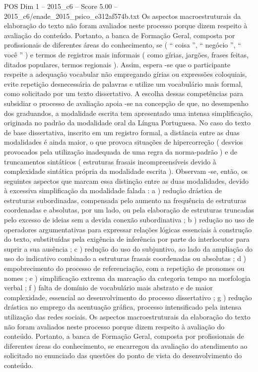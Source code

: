 \begin{textsample}{POS Dim 1 – 2015\_c6 – Score 5.00 – 2015\_c6/enade\_2015\_psico\_e312af574b.txt}
Os aspectos macroestruturais da elaboração do texto não foram avaliados neste processo porque dizem respeito à avaliação do conteúdo.
Portanto, a banca de Formação Geral, composta por profissionais de diferentes áreas do conhecimento, se ( “ coisa ”, “ negócio ”, “ você ” ) e termos de registros mais informais ( como gírias, jargões, frases feitas, ditados populares, termos regionais ).
Assim, espera -se que o participante respeite a adequação vocabular não empregando gírias ou expressões coloquiais, evite repetição desnecessária de palavras e utilize um vocabulário mais formal, como solicitado por um texto dissertativo.
A escolha dessas competências para subsidiar o processo de avaliação apoia -se na concepção de que, no desempenho dos graduandos, a modalidade escrita tem apresentado uma intensa simplificação, originada no padrão da modalidade oral da Língua Portuguesa.
No caso do texto de base dissertativa, inscrito em um registro formal, a distância entre as duas modalidades é ainda maior, o que provoca situações de hipercorreção ( desvios provocados pela utilização inadequada de uma regra da norma-padrão ) e de truncamentos sintáticos ( estruturas frasais incompreensíveis devido à complexidade sintática própria da modalidade escrita ).
Observam -se, então, os seguintes aspectos que marcam essa distinção entre as duas modalidades, devido à excessiva simplificação da modalidade falada : a ) redução drástica de estruturas subordinadas, compensada pelo aumento na frequência de estruturas coordenadas e absolutas, por um lado, ou pela elaboração de estruturas truncadas pelo excesso de ideias sem a devida conexão subordinativa ; b ) redução no uso de operadores argumentativas para expressar relações lógicas essenciais à construção do texto, substituídas pela exigência de inferência por parte do interlocutor para suprir a sua ausência ; c ) redução do uso do subjuntivo, ao lado da ampliação do uso do indicativo combinado a estruturas frasais coordenadas ou absolutas ; d ) empobrecimento do processo de referenciação, com a repetição de pronomes ou nomes ; e ) simplificação extrema da marcação da categoria tempo na morfologia verbal ; f ) falta de domínio de vocabulário mais abstrato e de maior complexidade, essencial ao desenvolvimento do processo dissertativo ; g ) redução drástica no emprego da acentuação gráfica, processo intensificado pela intensa utilização das redes sociais.
Os aspectos macroestruturais da elaboração do texto não foram avaliados neste processo porque dizem respeito à avaliação do conteúdo.
Portanto, a banca de Formação Geral, composta por profissionais de diferentes áreas do conhecimento, se encarregou da avaliação do atendimento ao solicitado no enunciado das questões do ponto de vista do desenvolvimento do conteúdo.

\end{textsample}
